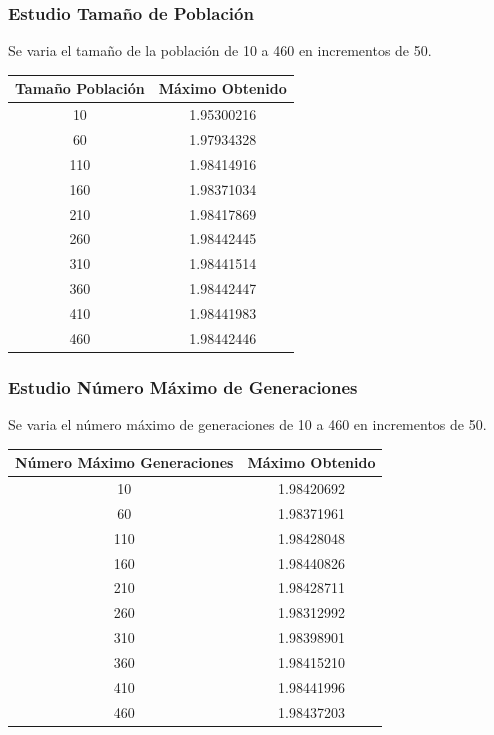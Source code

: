 \documentclass[12pt]{article}
\begin{document}
\subsubsection*{Estudio Tamaño de Población}
	Se varia el tamaño de la población de 10 a 460 en incrementos de 50.
\begin{table}[H]
\begin{center}
\begin{tabular}{|cc|} \hline
Tamaño Población & Máximo Obtenido \\  \hline
10  & 1.95300216 \\ 
60  & 1.97934328 \\ 
110 & 1.98414916 \\
160 & 1.98371034 \\
210 & 1.98417869 \\
260 & 1.98442445 \\
310 & 1.98441514 \\
360 & 1.98442447 \\ 
410 & 1.98441983 \\
460 & 1.98442446 \\  \hline
\end{tabular}
\end{center}
\end{table}
 

\subsubsection*{Estudio Número Máximo de Generaciones}
	Se varia el número máximo de generaciones de 10 a 460 en incrementos de 50.
\begin{table}[H]
\begin{center}
\begin{tabular}{|cc|} \hline
Número Máximo Generaciones & Máximo Obtenido \\  \hline
10  & 1.98420692 \\ 
60  & 1.98371961 \\ 
110 & 1.98428048 \\
160 & 1.98440826 \\
210 & 1.98428711 \\
260 & 1.98312992 \\
310 & 1.98398901 \\
360 & 1.98415210 \\ 
410 & 1.98441996 \\
460 & 1.98437203 \\  \hline
\end{tabular}
\end{center}
\end{table}
\end{document}
